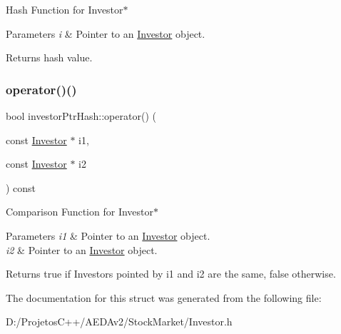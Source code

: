 Hash Function for Investor$\ast$ 
\begin{DoxyParams}{Parameters}
{\em i} & Pointer to an \hyperlink{class_investor}{Investor} object. \\
\hline
\end{DoxyParams}
\begin{DoxyReturn}{Returns}
hash value. 
\end{DoxyReturn}
\mbox{\label{structinvestor_ptr_hash_a121a824a56efb5597de907cf916f8b52}} 
\subsubsection{\texorpdfstring{operator()()}{operator()()}\hspace{0.1cm}{\footnotesize\ttfamily [2/2]}}
{\footnotesize\ttfamily bool investor\+Ptr\+Hash\+::operator() (\begin{DoxyParamCaption}\item[{const \hyperlink{class_investor}{Investor} $\ast$}]{i1,  }\item[{const \hyperlink{class_investor}{Investor} $\ast$}]{i2 }\end{DoxyParamCaption}) const\hspace{0.3cm}{\ttfamily [inline]}}

Comparison Function for Investor$\ast$ 
\begin{DoxyParams}{Parameters}
{\em i1} & Pointer to an \hyperlink{class_investor}{Investor} object. \\
\hline
{\em i2} & Pointer to an \hyperlink{class_investor}{Investor} object. \\
\hline
\end{DoxyParams}
\begin{DoxyReturn}{Returns}
true if Investors pointed by i1 and i2 are the same, false otherwise. 
\end{DoxyReturn}


The documentation for this struct was generated from the following file\+:\begin{DoxyCompactItemize}
\item 
D\+:/\+Projetos\+C++/\+A\+E\+D\+Av2/\+Stock\+Market/Investor.\+h\end{DoxyCompactItemize}
